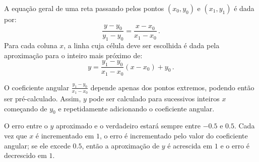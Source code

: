 A equação geral de uma reta passando pelos pontos $(x_0,y_0)$ e  $(x_1,y_1)$
é dada por:
\begin{equation*}
\frac{y-y_0}{y_1-y_0}=\frac{x-x_0}{x_1-x_0}\,.
\end{equation*}
Para cada coluna $x$, a linha cuja célula deve ser escolhida é dada pela
aproximação para o inteiro mais próximo de:
\begin{equation*}
y=\frac{y_1-y_0}{x_1-x_0}(x-x_0) + y_0\,.
\end{equation*}

O coeficiente angular $\frac{y_1-y_0}{x_1-x_0}$ depende apenas dos pontos
extremos, podendo então ser pré-calculado. Assim, $y$ pode ser calculado para
sucessivos inteiros $x$ começando de $y_0$ e repetidamente adicionando o
coeficiente angular.

O erro entre o $y$ aproximado e o verdadeiro estará sempre entre $-0.5$ e
$0.5$. Cada vez que $x$ é incrementado em $1$, o erro é incrementado pelo valor
do coeficiente angular; se ele excede $0.5$, então a aproximação de $y$ é
acrescida em $1$ e o erro é decrescido em $1$.

\nocite{wiki:Bresenham_line}